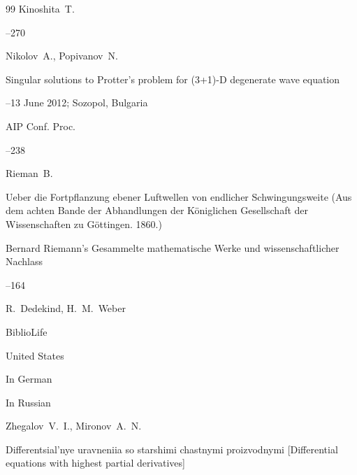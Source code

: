 \begin{thebibliography}{99}
\by Kinoshita~T.




--270







\by Nikolov~A., Popivanov~N.

\paper Singular solutions to Protter's problem for (3+1)-D degenerate wave equation

–13 June 2012; Sozopol, Bulgaria

\serial AIP Conf. Proc.



--238






\by Rieman~B.

\paper Ueber die Fortpflanzung ebener Luftwellen von endlicher Schwingungsweite (Aus dem achten Bande der Abhandlungen der K\"oniglichen Gesellschaft der Wissenschaften zu G\"ottingen. 1860.)

\inbook Bernard Riemann's Gesammelte mathematische Werke und wissenschaftlicher Nachlass


--164

\eds R.~Dedekind, H.~M.~Weber

\publ BiblioLife

\publaddr United States

\lang In German





\lang In Russian

\by Zhegalov~V.~I., Mironov~A.~N. 

\book Differentsial'nye uravneniia so starshimi chastnymi proizvodnymi \rm [Differential equations with highest partial derivatives]


\end{thebibliography}
